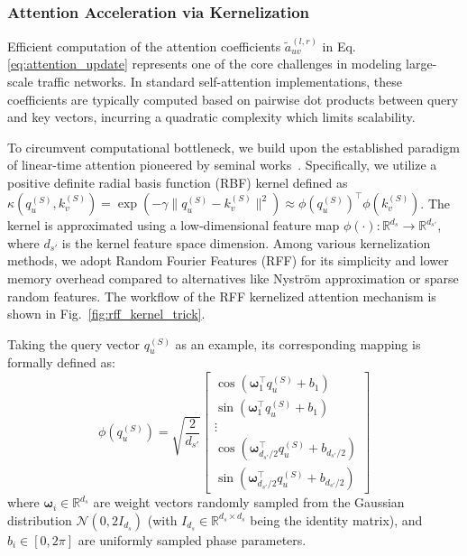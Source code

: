 \documentclass[5p,times,authoryear]{elsarticle}
\begin{document}
\subsubsection{Attention Acceleration via Kernelization}
Efficient computation of the attention coefficients $\tilde{a}_{uv}^{(l, r)}$ in Eq.\eqref{eq:attention_update} represents one of the core challenges in modeling large-scale traffic networks. In standard self-attention implementations, these coefficients are typically computed based on pairwise dot products between query and key vectors, incurring a quadratic complexity which limits scalability.

To circumvent computational bottleneck, we build upon the established paradigm of linear-time attention pioneered by seminal works~\citep{katharopoulos2020transformers, choromanski2021rethinking}. Specifically, we utilize a positive definite radial basis function (RBF) kernel defined as $\kappa(q_u^{(S)}, k_v^{(S)}) = \exp(-\gamma \|q_u^{(S)} - k_v^{(S)}\|^2) \approx \phi(q_u^{(S)})^\top \phi(k_v^{(S)})$. The kernel is approximated using a low-dimensional feature map $\phi(\cdot):\mathbb{R}^{d_s} \to \mathbb{R}^{d_{s'}}$, where $d_{s'}$ is the kernel feature space dimension. Among various kernelization methods, we adopt Random Fourier Features (RFF)\citep{rahimi2007random} for its simplicity and lower memory overhead compared to alternatives like Nystr\"om approximation\citep{williams2001nystrom} or sparse random features\citep{yu2016orthogonal}. The workflow of the RFF kernelized attention mechanism is shown in Fig.~\ref{fig:rff_kernel_trick}.

Taking the query vector $q_u^{(S)}$ as an example, its corresponding mapping is formally defined as:
\vspace{-3pt}
\begin{equation}
\label{eq:kernel_mapping}
\phi(q_u^{(S)}) = \sqrt{\frac{2}{d_{s'}}} \begin{bmatrix}
\cos(\mathbf{\omega}_1^\top q_u^{(S)} + b_1) \\
\sin(\mathbf{\omega}_1^\top q_u^{(S)} + b_1) \\
\vdots \\
\cos(\mathbf{\omega}_{d_{s'}/2}^\top q_u^{(S)} + b_{d_{s'}/2}) \\
\sin(\mathbf{\omega}_{d_{s'}/2}^\top q_u^{(S)} + b_{d_{s'}/2})
\end{bmatrix}
\end{equation}
\vspace{-3pt}
where $\mathbf{\omega}_i \in \mathbb{R}^{d_s}$ are weight vectors randomly sampled from the Gaussian distribution $\mathcal{N}(0,2I_{d_s})$ (with $I_{d_s} \in \mathbb{R}^{d_s \times d_s}$ being the identity matrix), and $b_i \in [0, 2\pi]$ are uniformly sampled phase parameters.
\end{document}
